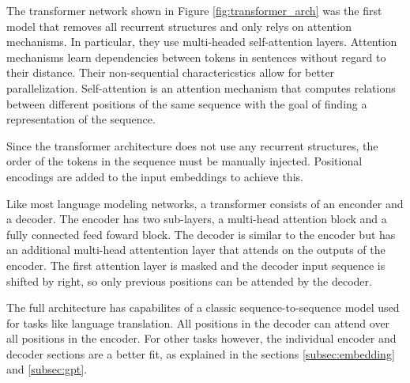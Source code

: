 \documentclass[../../main.tex]{subfiles}
\begin{document}
The transformer network \cite{Vaswani2017}
shown in Figure \ref{fig:transformer_arch}
was the first model that removes all recurrent structures
and only relys on attention mechanisms.
In particular,
they use multi-headed self-attention layers.
Attention mechanisms learn dependencies between tokens in sentences
without regard to their distance.
Their non-sequential charactericstics allow for better parallelization.
Self-attention is an attention mechanism
that computes relations between different positions of the same sequence
with the goal of finding a representation of the sequence.

Since the transformer architecture does not use any recurrent structures,
the order of the tokens in the sequence must be manually injected.
Positional encodings are added to the input embeddings to achieve this.

Like most language modeling networks,
a transformer consists of an enconder and a decoder.
The encoder has two sub-layers,
a multi-head attention block
and a fully connected feed foward block.
The decoder is similar to the encoder
but has an additional multi-head attentention layer
that attends on the outputs of the encoder.
The first attention layer is masked
and the decoder input sequence is shifted by right,
so only previous positions can be
attended by the decoder.

The full architecture has capabilites of a classic sequence-to-sequence model
used for tasks like language translation.
All positions in the decoder can attend over all positions in the encoder.
For other tasks however,
the individual encoder and decoder sections are a better fit,
as explained in the sections \ref{subsec:embedding} and \ref{subsec:gpt}.
\end{document}
